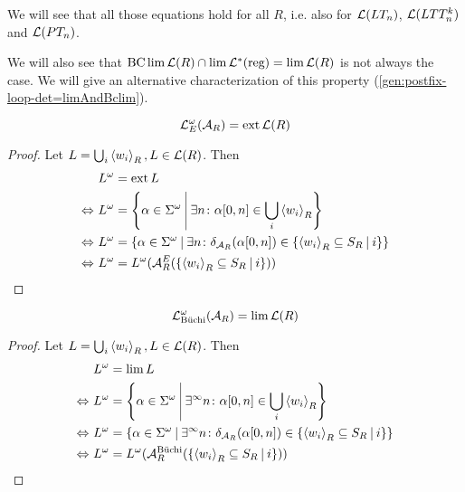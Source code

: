We will see that all those equations hold for all $R$, i.e. also for $\mathcal{L}(LT_n)$, $\mathcal{L}(LTT^k_n)$ and $\mathcal{L}(PT_n)$.

We will also see that $\operatorname{BC} \lim \mathcal{L}(R) \cap \lim \mathcal{L}^*(\text{reg}) = \lim \mathcal{L}(R)$ is not always the case. We will give an alternative characterization of this property (\cref{gen:postfix-loop-det=limAndBclim}).

\begin{lemma}
\label{gen:lang_omega_e}
\[ \mathcal{L}^\omega_E(\mathcal{A}_R) = \operatorname{ext} \mathcal{L}(R) \]
\begin{proof}
Let $L = \bigcup_i \left< w_i\right>_R, L \in \mathcal{L}(R)$. Then
\begin{align*}
& L^\omega = \ext L \\
\Leftrightarrow \ & L^\omega = \Set{\alpha \in \Sigma^\omega}{\exists n \colon \alpha[0,n] \in \bigcup_i \left< w_i\right>_R} \\
\Leftrightarrow \ & L^\omega = \Set{\alpha \in \Sigma^\omega}{\exists n \colon \delta_{\A_R}(\alpha[0,n]) \in \Set{\left< w_i\right>_R \subseteq S_R}{i}} \\
\Leftrightarrow \ & L^\omega = L^\omega(\A^E_R(\Set{\left< w_i\right>_R \subseteq S_R}{i}))
\end{align*}
\end{proof}
\end{lemma}

\begin{lemma}
\label{gen:lang_omega_buechi}
\[ \mathcal{L}^\omega_{\text{Büchi}}(\mathcal{A}_R) = \lim \mathcal{L}(R) \]
\begin{proof}
Let $L = \bigcup_i \left< w_i\right>_R, L \in \mathcal{L}(R)$. Then
\begin{align*}
& L^\omega = \lim L \\
\Leftrightarrow \ & L^\omega = \Set{\alpha \in \Sigma^\omega}{\exists^\infty n \colon \alpha[0,n] \in \bigcup_i \left< w_i\right>_R} \\
\Leftrightarrow \ & L^\omega = \Set{\alpha \in \Sigma^\omega}{\exists^\infty n \colon \delta_{\A_R}(\alpha[0,n]) \in \Set{\left< w_i\right>_R \subseteq S_R}{i}} \\
\Leftrightarrow \ & L^\omega = L^\omega(\A^{\text{Büchi}}_R(\Set{\left< w_i\right>_R \subseteq S_R}{i}))
\end{align*}
\end{proof}
\end{lemma}

